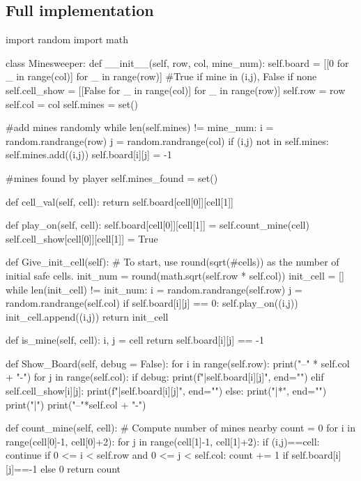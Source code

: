 \documentclass{article} %
\begin{document}
\subsection{Full implementation}
\begin{code}
    import random
import math

class Minesweeper:
    def __init__(self, row, col, mine_num):
        self.board = [[0 for _ in range(col)] for _ in range(row)] #True if mine in (i,j), False if none
        self.cell_show = [[False for _ in range(col)] for _ in range(row)]
        self.row = row
        self.col = col
        self.mines = set()

        #add mines randomly
        while len(self.mines) != mine_num:
            i = random.randrange(row)
            j = random.randrange(col)
            if (i,j) not in self.mines:
                self.mines.add((i,j))
                self.board[i][j] = -1
        
        #mines found by player
        self.mines_found = set()

    def cell_val(self, cell):
        return self.board[cell[0]][cell[1]]

    def play_on(self, cell):
        self.board[cell[0]][cell[1]] = self.count_mine(cell)
        self.cell_show[cell[0]][cell[1]] = True

    def Give_init_cell(self):
        # To start, use round(sqrt(#cells)) as the number of initial safe cells.
        init_num = round(math.sqrt(self.row * self.col))
        init_cell = []
        while len(init_cell) != init_num:
            i = random.randrange(self.row)
            j = random.randrange(self.col)
            if self.board[i][j] == 0:
                self.play_on((i,j))
                init_cell.append((i,j))
        return init_cell

    def is_mine(self, cell):
        i, j = cell
        return self.board[i][j] == -1

    def Show_Board(self, debug = False):
        for i in range(self.row):
            print("--" * self.col + "-")
            for j in range(self.col):
                if debug:
                    print(f"|{self.board[i][j]}", end="")
                elif self.cell_show[i][j]:
                    print(f"|{self.board[i][j]}", end="")
                else:
                    print("|*", end="")
            print("|")
        print("--"*self.col + "-")

    def count_mine(self, cell):
        # Compute number of mines nearby
        count = 0
        for i in range(cell[0]-1, cell[0]+2):
            for j in range(cell[1]-1, cell[1]+2):
                if (i,j)==cell:
                    continue
                if 0 <= i < self.row and 0 <= j < self.col:
                    count += 1 if self.board[i][j]==-1 else 0
        return count
    

\end{code}
\end{document}
